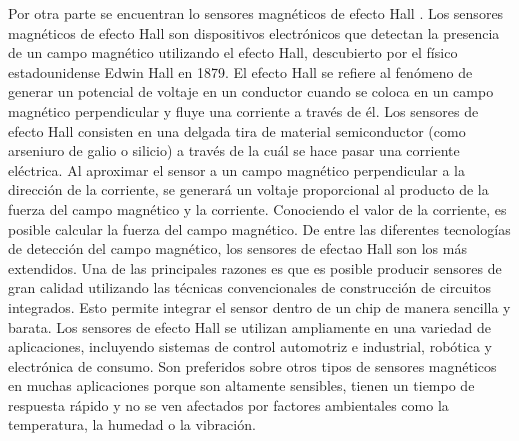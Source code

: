 \documentclass[a4paper,12pt]{book}
\begin{document}
Por otra parte se encuentran lo sensores magnéticos de efecto Hall \cite{ramsden2011hall}. Los sensores magnéticos de efecto Hall son dispositivos electrónicos que detectan la presencia de un campo magnético utilizando el efecto Hall, descubierto por el físico estadounidense Edwin Hall en 1879. {\color{red}El efecto Hall se refiere al fenómeno de generar un potencial de voltaje en un conductor cuando se coloca en un campo magnético perpendicular y fluye una corriente a través de él.} Los sensores de efecto Hall consisten en una delgada tira de material semiconductor (como arseniuro de galio o silicio) a través de la cuál se hace pasar una corriente eléctrica. Al aproximar el sensor a un campo magnético perpendicular a la dirección de la corriente, se generará un voltaje proporcional al producto de la fuerza del campo magnético y la corriente. Conociendo el valor de la corriente, es posible calcular la fuerza del campo magnético. De entre las diferentes tecnologías de detección del campo magnético, los sensores de efectao Hall son los más extendidos. Una de las principales razones es que es posible producir sensores de gran calidad utilizando las técnicas convencionales de construcción de circuitos integrados. Esto permite integrar el sensor dentro de un chip de manera sencilla y barata. {\color{red}Los sensores de efecto Hall se utilizan ampliamente en una variedad de aplicaciones, incluyendo sistemas de control automotriz e industrial, robótica y electrónica de consumo. Son preferidos sobre otros tipos de sensores magnéticos en muchas aplicaciones porque son altamente sensibles, tienen un tiempo de respuesta rápido y no se ven afectados por factores ambientales como la temperatura, la humedad o la vibración.}
\end{document}
